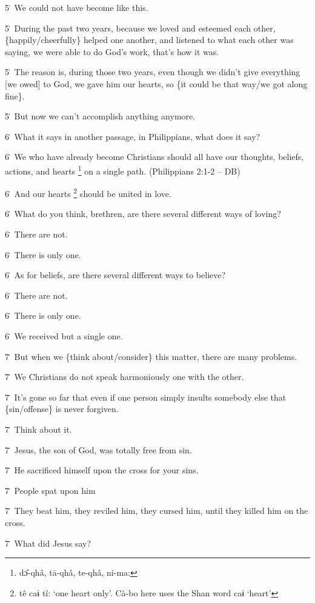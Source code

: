 5\. We could not have become like this.

5\. During the past two years, because we loved and esteemed each other, \{happily/cheerfully\}
helped one another, and listened to what each other was saying, we were able to
do God's work, that's how it was.

5\. The reason is, during those two years, even though we didn't give everything
[we owed] to God, we gave him our hearts, so \{it could be that way/we got along
fine\}.

5\. But now we can't accomplish anything anymore.

6\. What it says in another passage, in Philippians, what does it say?

6\. We who have already become Christians should all have our thoughts, beliefs,
actions, and hearts \footnote{dɔ̂-qhâ, tā-qhâ, te-qhâ, ni-ma:} on a single path. (Philippians 2:1-2 -- DB)

6\. And our hearts \footnote{tê caɨ tí: `one heart only'. Cà-bo here uses the Shan word caɨ `heart'} should be united in love.

6\. What do you think, brethren, are there several different ways of loving?

6\. There are not.

6\. There is only one.

6\. As for beliefs, are there several different ways to believe?

6\. There are not.

6\. There is only one.

6\. We received but a single one.

7\. But when we \{think about/consider\} this matter, there are many problems.

7\. We Christians do not speak harmoniously one with the other.

7\. It's gone so far that even if one person simply insults somebody else that
\{sin/offense\} is never forgiven.

7\. Think about it.

7\. Jesus, the son of God, was totally free from sin.

7\. He sacrificed himself upon the cross for your sins.

7\. People spat upon him

7\. They beat him, they reviled him, they cursed him, until they killed him on
the cross.

7\. What did Jesus say?

